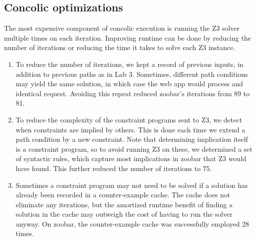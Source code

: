 \documentclass{scrartcl}
\begin{document}
\subsection{Concolic optimizations}

The most expensive component of concolic execution is running the Z3
solver multiple times on each iteration. Improving runtime can be done
by reducing the number of iterations or reducing the time it takes to
solve each Z3 instance.

\begin{enumerate}
\item To reduce the number of iterations, we kept a record of previous
  inputs, in addition to previous paths as in Lab 3. Sometimes,
  different path conditions may yield the same solution, in which case
  the web app would process and identical request. Avoiding this
  repeat reduced zoobar's iterations from 89 to 81.

\item To reduce the complexity of the constraint programs sent to Z3,
  we detect when constraints are implied by others. This is done each
  time we extend a path condition by a new constraint. Note that
  determining implication itself is a constraint program, so to avoid
  running Z3 on these, we determined a set of syntactic rules, which
  capture most implications in zoobar that Z3 would have found. This
  further reduced the number of iterations to 75.

\item Sometimes a constraint program may not need to be solved if a
  solution has already been recorded in a counter-example cache. The
  cache does not eliminate any iterations, but the amortized runtime
  benefit of finding a solution in the cache may outweigh the cost of
  having to run the solver anyway. On zoobar, the counter-example
  cache was successfully employed 28 times.
\end{enumerate}
\end{document}
